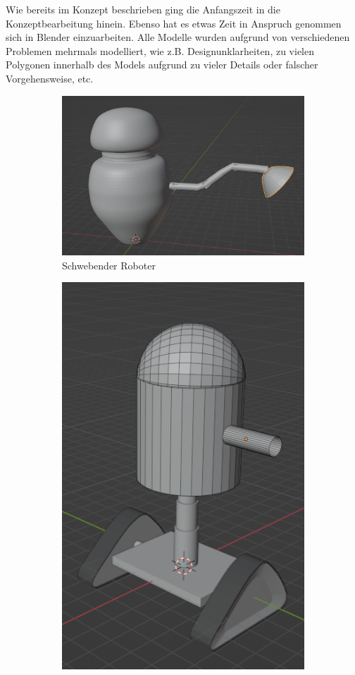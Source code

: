 Wie bereits im Konzept beschrieben ging die Anfangszeit in die Konzeptbearbeitung hinein. Ebenso hat es etwas Zeit in Anspruch genommen sich in Blender einzuarbeiten. Alle Modelle wurden aufgrund von verschiedenen Problemen mehrmals modelliert, wie z.B. Designunklarheiten, zu vielen Polygonen innerhalb des Models aufgrund zu vieler Details oder falscher Vorgehensweise, etc.
\begin{figure}[H]
	\begin{subfigure}{0.5\textwidth}
		\centering
		\includegraphics[height=0.3\pageheight,keepaspectratio]{pics/6}
		\caption{Schwebender Roboter}
	\end{subfigure}
	\begin{subfigure}{0.5\textwidth}
		\centering
		\includegraphics[height=0.3\pageheight,keepaspectratio]{pics/7}

\end{subfigure}
\end{figure}
